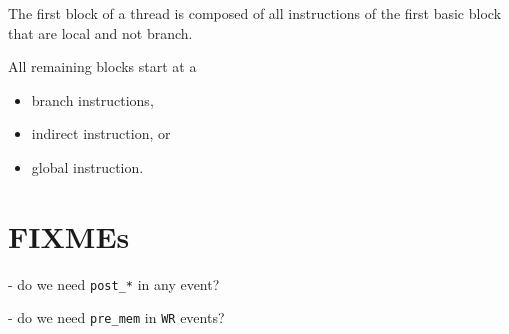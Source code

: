 \documentclass{llncs}
\begin{document}
The first block of a thread is composed of all instructions of the first basic
block that are local and not branch.

All remaining blocks start at a
\begin{itemize}
\item branch instructions,
\item indirect instruction, or
\item global instruction.
\end{itemize}

\section{FIXMEs}

- do we need \verb!post_*! in any event?

- do we need \verb!pre_mem! in \verb!WR! events?




\end{document}

